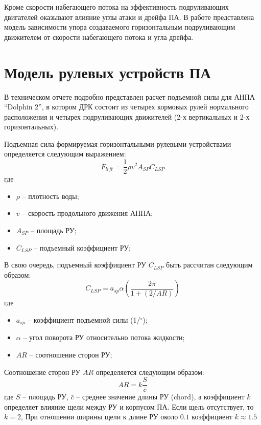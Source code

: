 Кроме скорости набегающего потока на эффективность подруливающих двигателей оказывают влияние углы атаки и дрейфа ПА.
В работе \cite{palmer2008modelling} представлена модель зависимости упора создаваемого горизонтальным подруливающим движителем от скорости набегающего потока и угла дрейфа.

\section{Модель рулевых устройств ПА}
В техническом отчете \cite{steenson2011control} подробно представлен расчет подъемной силы для АНПА ``Dolphin 2'', в котором ДРК состоит из четырех кормовых рулей нормального расположения и четырех подруливающих движителей (2-х вертикальных и 2-х горизонтальных).

Подъемная сила формируемая горизонтальными рулевыми устройствами определяется следующим выражением:
\begin{equation*}
    F_{lift} = \frac{1}{2}\rho v^2 A_{SP} C_{LSP}
\end{equation*}
\noindent где
\begin{itemize}
    \item $\rho$ -- плотность воды;
    \item $v$ -- скорость продольного движения АНПА;
    \item $A_{SP}$ -- площадь РУ;
    \item $C_{LSP}$ -- подъемный коэффициент РУ;
\end{itemize}

В свою очередь, подъемный коэффициент РУ $C_{LSP}$ быть рассчитан следующим образом:
\begin{equation*}
    C_{LSP} = a_{sp}\alpha \left( \frac{2 \pi}{1 + (2/AR)} \right)
\end{equation*}
\noindent где
\begin{itemize}
    \item $a_{sp}$ -- коэффициент подъемной силы (1/$^\circ$);
    \item $\alpha$ -- угол поворота РУ относительно потока жидкости;
    \item $AR$ -- соотношение сторон РУ;
\end{itemize}

Соотношение сторон РУ $AR$ определяется следующим образом:
\begin{equation*}
    AR = k \frac{S}{\bar{c}}
\end{equation*}
\noindent где $S$ -- площадь РУ, $\bar{c}$ -- среднее значение длины РУ (chord), а коэффициент $k$ определяет влияние щели между РУ и корпусом ПА. Если щель отсутствует, то $k=2$, При отношении ширины щели к длине РУ около $0.1$ коэффициент $k\approx1.5$

